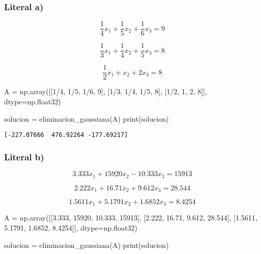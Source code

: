 \documentclass[
  letterpaper,
  DIV=11,
  numbers=noendperiod]{scrartcl}
\newenvironment{Shaded}{\begin{snugshade}}{\end{snugshade}}
\newcommand{\BuiltInTok}[1]{\textcolor[rgb]{0.00,0.23,0.31}{#1}}
\newcommand{\DecValTok}[1]{\textcolor[rgb]{0.68,0.00,0.00}{#1}}
\newcommand{\FloatTok}[1]{\textcolor[rgb]{0.68,0.00,0.00}{#1}}
\newcommand{\NormalTok}[1]{\textcolor[rgb]{0.00,0.23,0.31}{#1}}
\newcommand{\OperatorTok}[1]{\textcolor[rgb]{0.37,0.37,0.37}{#1}}
\begin{document}
\subsubsection{Literal a)}\label{literal-a-3}

\[\frac{1}{4}x_1 + \frac{1}{5}x_2 + \frac{1}{6}x_3 = 9\]

\[\frac{1}{3}x_1 + \frac{1}{4}x_2 + \frac{1}{5}x_3= 8\]

\[\frac{1}{2}x_1 + x_2 + 2x_3 = 8\]

\begin{Shaded}
\begin{Highlighting}[]

\NormalTok{A }\OperatorTok{=}\NormalTok{ np.array([[}\DecValTok{1}\OperatorTok{/}\DecValTok{4}\NormalTok{, }\DecValTok{1}\OperatorTok{/}\DecValTok{5}\NormalTok{, }\DecValTok{1}\OperatorTok{/}\DecValTok{6}\NormalTok{, }\DecValTok{9}\NormalTok{],}
\NormalTok{              [}\DecValTok{1}\OperatorTok{/}\DecValTok{3}\NormalTok{, }\DecValTok{1}\OperatorTok{/}\DecValTok{4}\NormalTok{, }\DecValTok{1}\OperatorTok{/}\DecValTok{5}\NormalTok{, }\DecValTok{8}\NormalTok{],}
\NormalTok{              [}\DecValTok{1}\OperatorTok{/}\DecValTok{2}\NormalTok{, }\DecValTok{1}\NormalTok{, }\DecValTok{2}\NormalTok{, }\DecValTok{8}\NormalTok{]], dtype}\OperatorTok{=}\NormalTok{np.float32)}

\NormalTok{solucion }\OperatorTok{=}\NormalTok{ eliminacion\_gaussiana(A)}
\BuiltInTok{print}\NormalTok{(solucion)}
\end{Highlighting}
\end{Shaded}

\begin{verbatim}
[-227.07666  476.92264 -177.69217]
\end{verbatim}

\subsubsection{Literal b)}\label{literal-b-3}

\[3.333x_1 + 15920x_2 - 10.333x_3 = 15913\]

\[2.222x_1 + 16.71x_2 + 9.612x_3 = 28.544\]

\[1.5611x_1 + 5.1791x_2 + 1.6852x_3 = 8.4254\]

\begin{Shaded}
\begin{Highlighting}[]

\NormalTok{A }\OperatorTok{=}\NormalTok{ np.array([[}\FloatTok{3.333}\NormalTok{, }\DecValTok{15920}\NormalTok{, }\FloatTok{10.333}\NormalTok{, }\DecValTok{15913}\NormalTok{],}
\NormalTok{              [}\FloatTok{2.222}\NormalTok{, }\FloatTok{16.71}\NormalTok{, }\FloatTok{9.612}\NormalTok{, }\FloatTok{28.544}\NormalTok{],}
\NormalTok{              [}\FloatTok{1.5611}\NormalTok{, }\FloatTok{5.1791}\NormalTok{, }\FloatTok{1.6852}\NormalTok{, }\FloatTok{8.4254}\NormalTok{]], dtype}\OperatorTok{=}\NormalTok{np.float32)}

\NormalTok{solucion }\OperatorTok{=}\NormalTok{ eliminacion\_gaussiana(A)}
\BuiltInTok{print}\NormalTok{(solucion)}
\end{Highlighting}
\end{Shaded}
\end{document}
